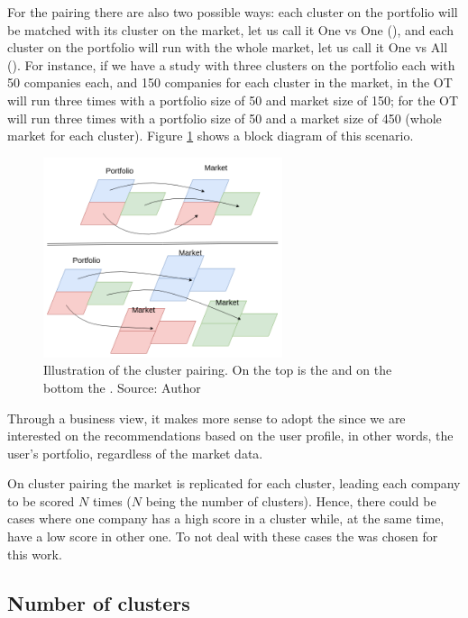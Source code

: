 For the pairing there are also two possible ways: each cluster on the portfolio will be matched with its cluster on the market, let us call it One vs One (\nameClusterPairingA{}), and each cluster on the portfolio will run with the whole market, let us call it One vs All (\nameClusterPairingB{}). For instance, if we have a study with three clusters on the portfolio each with 50 companies each, and 150 companies for each cluster in the market, in \nameClusterPairingA{} the OT will run three times with a portfolio size of 50 and market size of 150; for \nameClusterPairingB{} the OT will run three times with a portfolio size of 50 and a market size of 450 (whole market for each cluster). Figure \ref{fig:cluster-pairing} shows a block diagram of this scenario.

\begin{figure}[h]
   \centering
   \includegraphics[width=7cm]{fig/ch3-cluster-pairing.png}
   \caption{Illustration of the cluster pairing. On the top is the \nameClusterPairingA{} and on the bottom the \nameClusterPairingB{}. Source: Author}
   \label{fig:cluster-pairing}
\end{figure}

Through a business view, it makes more sense to adopt the \textbf{\nameClusterStrategyA{}} since we are interested on the recommendations based on the user profile, in other words, the user's portfolio, regardless of the market data. 

On cluster pairing \nameClusterStrategyB{} the market is replicated for each cluster, leading each company to be scored $N$ times ($N$ being the number of clusters). Hence, there could be cases where one company has a high score in a cluster while, at the same time, have a low score in other one. To not deal with these cases the \textbf{\nameClusterPairingA{}} was chosen for this work.

\subsection{Number of clusters}

